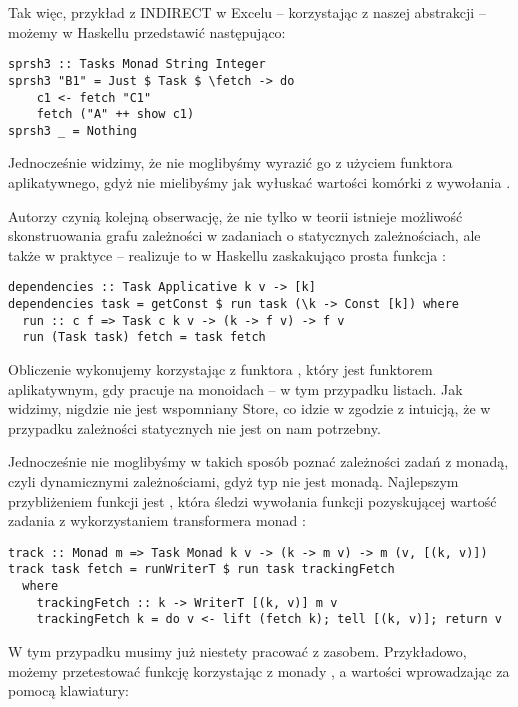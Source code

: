 Tak więc, przykład z INDIRECT w Excelu -- korzystając z naszej abstrakcji -- możemy w Haskellu przedstawić następująco:

\begin{lstlisting}
sprsh3 :: Tasks Monad String Integer
sprsh3 "B1" = Just $ Task $ \fetch -> do
    c1 <- fetch "C1"
    fetch ("A" ++ show c1)
sprsh3 _ = Nothing
\end{lstlisting}

Jednocześnie widzimy, że nie moglibyśmy wyrazić go z użyciem funktora aplikatywnego, gdyż nie mielibyśmy jak wyłuskać wartości komórki z wywołania .

Autorzy czynią kolejną obserwację, że nie tylko w teorii istnieje możliwość skonstruowania grafu zależności w zadaniach o statycznych zależnościach, ale także w praktyce -- realizuje to w Haskellu zaskakująco prosta funkcja :

\begin{lstlisting}
dependencies :: Task Applicative k v -> [k]
dependencies task = getConst $ run task (\k -> Const [k]) where
  run :: c f => Task c k v -> (k -> f v) -> f v
  run (Task task) fetch = task fetch
\end{lstlisting}

Obliczenie wykonujemy korzystając z funktora , który jest funktorem aplikatywnym, gdy pracuje na monoidach -- w tym przypadku listach. Jak widzimy, nigdzie nie jest wspomniany Store, co idzie w zgodzie z intuicją, że w przypadku zależności statycznych nie jest on nam potrzebny.

Jednocześnie nie moglibyśmy w takich sposób poznać zależności zadań z monadą, czyli dynamicznymi zależnościami, gdyż typ  nie jest monadą. Najlepszym przybliżeniem funkcji  jest , która śledzi wywołania funkcji pozyskującej wartość zadania z wykorzystaniem transformera monad :

\begin{lstlisting}
track :: Monad m => Task Monad k v -> (k -> m v) -> m (v, [(k, v)])
track task fetch = runWriterT $ run task trackingFetch
  where
    trackingFetch :: k -> WriterT [(k, v)] m v
    trackingFetch k = do v <- lift (fetch k); tell [(k, v)]; return v
\end{lstlisting}

W tym przypadku musimy już niestety pracować z zasobem. Przykładowo, możemy przetestować funkcję  korzystając z monady , a wartości wprowadzając za pomocą klawiatury:

